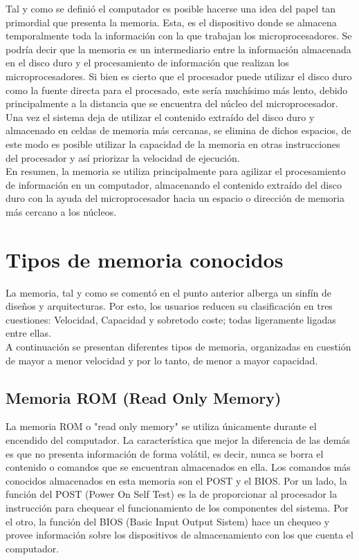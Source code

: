 \documentclass{article}
\begin{document}
\noindent
Tal y como se definió el computador es posible hacerse una idea del papel tan primordial que presenta la memoria. Esta, es el dispositivo donde se almacena temporalmente toda la información con la que trabajan los microprocesadores. Se podría decir que la memoria es un intermediario entre la información almacenada en el disco duro y el procesamiento de información que realizan los microprocesadores. Si bien es cierto que el procesador puede utilizar el disco duro como la fuente directa para el procesado, este sería muchísimo más lento, debido principalmente a la distancia que se encuentra del núcleo del microprocesador.
Una vez el sistema deja de utilizar el contenido extraído del disco duro y almacenado en celdas de memoria más cercanas, se elimina de dichos espacios, de este modo es posible utilizar la capacidad de la memoria en otras instrucciones del procesador y así priorizar la velocidad de ejecución.\cite{Augusto}\\
\noindent
En resumen, la memoria se utiliza principalmente para agilizar el procesamiento de información en un computador, almacenando el contenido extraído del disco duro con la ayuda del microprocesador hacia un espacio o dirección de memoria más cercano a los núcleos.


\section{Tipos de memoria conocidos} \label{contenido}
\noindent
La memoria, tal y como se comentó en el punto anterior alberga un sinfín de diseños y arquitecturas. Por esto, los usuarios reducen su clasificación en tres cuestiones: Velocidad, Capacidad y sobretodo coste; todas ligeramente ligadas entre ellas.\cite{William}
\\ 
\noindent
A continuación se presentan diferentes tipos de memoria, organizadas en cuestión de mayor a menor velocidad y por lo tanto, de menor a mayor capacidad.

\subsection{Memoria ROM (Read Only Memory)}
\noindent
La memoria ROM o "read only memory" se utiliza únicamente durante el encendido del computador. La característica que mejor la diferencia de las demás es que no presenta información de forma volátil, es decir, nunca se borra el contenido o comandos que se encuentran almacenados en ella. Los comandos más conocidos almacenados en esta memoria son el POST y el BIOS.
Por un lado, la función del POST (Power On Self Test) es la de proporcionar al procesador la instrucción para chequear el funcionamiento de los componentes del sistema.
Por el otro, la función del BIOS (Basic Input Output Sistem) hace un chequeo y provee información sobre los dispositivos de almacenamiento con los que cuenta el computador.
\end{document}
